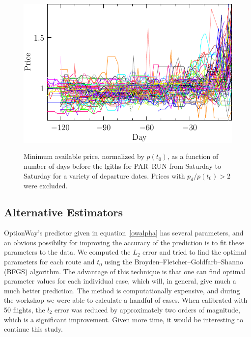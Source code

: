 \documentclass{article}
\begin{document}
\begin{figure}
  \begin{center}
    \includegraphics{pdf/PARRUN_SAT_7_norm}
    \label{PARRUN_SAT_7_norm}
    \caption{Minimum available price, normalized by $p(t_0)$, as a
      function of number of days before the lgiths for PAR--RUN from
      Saturday to Saturday for a variety of departure dates.  Prices
      with $p_d/p(t_0) > 2$ were excluded.}
  \end{center}
\end{figure}


\subsection{Alternative Estimators}

OptionWay's predictor given in equation~\eqref{owalpha} has several
parameters, and an obvious possibilty for improving the accuracy of
the prediction is to fit these parameters to the data.  We computed
the $L_2$ error and tried to find the optimal parameters for each
route and $t_0$ using the Broyden–Fletcher–Goldfarb–Shanno (BFGS)
algorithm.  The advantage of this technique is that one can find
optimal parameter values for each individual case, which will, in
general, give much a much better prediction.  The method is
computationally expensive, and during the workshop we were able to
calculate a handful of cases.  When calibrated with 50 flights, the
$l_2$ error was reduced by approximately two orders of magnitude,
which is a significant improvement.  Given more time, it would be
interesting to continue this study.
\end{document}
